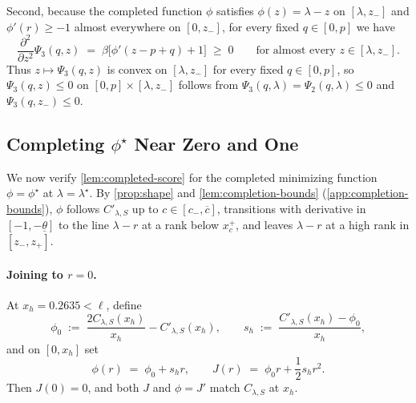 \documentclass[11pt]{article}
\numberwithin{equation}{section}
\theoremstyle{plain}
\theoremstyle{definition}
\newcommand{\1}{\mathbf{1}}
\begin{document}
Second, because the completed function $\phi$ satisfies $\phi(z) = \lambda - z$ on $[\lambda, z_-]$ and $\phi'(r) \ge -1$ almost everywhere on $[0, z_-]$, for every fixed $q \in [0, p]$ we have
\[
  \frac{\partial^2}{\partial z^2}\Psi_3(q, z) \;=\; \beta\bigl[\phi'(z - p + q) + 1\bigr] \;\ge\; 0
  \qquad\text{for almost every } z \in [\lambda, z_-].
\]
Thus $z \mapsto \Psi_3(q, z)$ is convex on $[\lambda, z_-]$ for every fixed $q \in [0, p]$, so $\Psi_3(q, z) \le 0$ on $[0, p] \times [\lambda, z_-]$ follows from $\Psi_3(q, \lambda) = \Psi_2(q, \lambda) \le 0$ and $\Psi_3(q, z_-) \le 0$.

\subsection{Completing \texorpdfstring{$\phi^\star$}{phi*} Near Zero and One}
\label{app:joining-curve}

We now verify \cref{lem:completed-score} for the completed minimizing function $\phi = \phi^\star$ at $\lambda = \lambda^\star$. By \cref{prop:shape} and \cref{lem:completion-bounds} (\cref{app:completion-bounds}), $\phi$ follows $C'_{\lambda, S}$ up to $c \in [c_-, \overline{c}]$, transitions with derivative in $[-1, -\underline{\theta}]$ to the line $\lambda - r$ at a rank below $x_c^+$, and leaves $\lambda - r$ at a high rank in $[z_-, z_+]$.

\paragraph{Joining to $r = 0$.}
At $x_h = 0.2635 < \ell$, define
\[
  \phi_0 \;:=\; \frac{2C_{\lambda, S}(x_h)}{x_h} - C'_{\lambda, S}(x_h),
  \qquad
  s_h \;:=\; \frac{C'_{\lambda, S}(x_h) - \phi_0}{x_h},
\]
and on $[0, x_h]$ set
\begin{equation}
  \phi(r) \;=\; \phi_0 + s_h r,
  \qquad
  J(r) \;=\; \phi_0 r + \frac{1}{2}s_h r^2.
  \label{eq:head-affine}
\end{equation}
Then $J(0) = 0$, and both $J$ and $\phi = J'$ match $C_{\lambda, S}$ at $x_h$.
\end{document}
